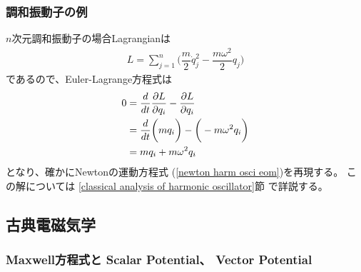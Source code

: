 \subsubsection{調和振動子の例}

$n$次元調和振動子の場合Lagrangianは
\begin{align}
  L = \sum_{j=1}^n
  \bigg(
    \dfrac{m}{2}\dot{q}_j^2
  -
    \dfrac{m\omega^2}{2} q_j
  \bigg)
\label{harmonic oscillator lagrangian}
\end{align}
であるので、Euler-Lagrange方程式は
\begin{align}
  0 &=
  \dfrac{d}{dt}\dfrac{\partial L}{\partial \dot{q}_i }
  - \dfrac{\partial L}{\partial q_i }
\notag\\&=
  \dfrac{d}{dt}
  \bigg(
    m\dot{q}_i
  \bigg)
  -
  \bigg(
  -
    m\omega^2 q_i
  \bigg)
\notag\\&=
    m\ddot{q}_i
  +
    m\omega^2 q_i
\end{align}
となり、確かにNewtonの運動方程式
(\ref{newton harm osci eom})を再現する。
この解については
\ref{classical analysis of harmonic oscillator}節
で詳説する。

\subsection{古典電磁気学}

\subsubsection{Maxwell方程式と  
  Scalar Potential、
  Vector Potential}

